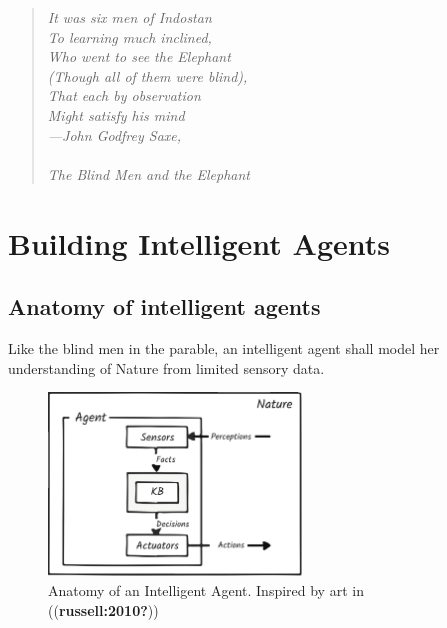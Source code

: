 \documentclass[
  letterpaper,
  DIV=11,
  numbers=noendperiod,
  oneside]{scrreprt}
\begin{document}
\begin{quote}
\emph{\hfill\break
It was six men of Indostan\\
To learning much inclined,\\
Who went to see the Elephant\\
(Though all of them were blind),\\
That each by observation\\
Might satisfy his mind\\
---John Godfrey Saxe,\\
\hspace*{0.333em}\\
The Blind Men and the Elephant~\protect\hypertarget{blind_men}{}{}\\
}
\end{quote}

\hypertarget{building-intelligent-agents}{%
\section{Building Intelligent
Agents}\label{building-intelligent-agents}}

\hypertarget{sec-anatomy_ia}{%
\subsection{Anatomy of intelligent agents}\label{sec-anatomy_ia}}

Like the blind men in the parable, an intelligent agent shall model her
understanding of Nature from limited sensory data.

\begin{figure}

{\centering \includegraphics[width=0.6\textwidth,height=\textheight]{imgs/anatomy.png}

}

\caption{\label{fig-anatomy}Anatomy of an Intelligent Agent. Inspired by
art in ((\textbf{russell:2010?}))}

\end{figure}
\end{document}
